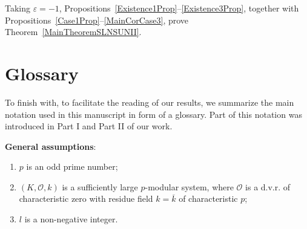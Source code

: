 \documentclass[12pt]{amsart}
\newcommand{\cO}{{\mathcal{O}}}
\theoremstyle{theorem}
\theoremstyle{definition}
\theoremstyle{remark}
\begin{document}
Taking 
$\varepsilon = -1$, Propositions~\ref{Existence1Prop}--\ref{Existence3Prop},
together with Propositions~\ref{Case1Prop}--\ref{MainCorCase3}, prove 
Theorem~\ref{MainTheoremSLNSUNII}.

\section{Glossary}\label{sec:Glossary}%
To finish with, to facilitate the reading of our results, we summarize the main 
notation used in this manuscript in form of a glossary. Part of this notation 
was introduced in Part I and Part II %
of our work. 

\medskip

\noindent\textbf{General assumptions}:
\begin{enumerate}[label=$\bullet$, leftmargin=5mm]
	\item  $p$ is an odd prime number;
	\item  $(K,\mathcal{O},k)$ is a sufficiently large $p$-modular system, 
               where $\cO$ is a d.v.r. of characteristic zero with residue 
               field $k=\overline{k}$ of characteristic $p$;
	\item  $l$ is a non-negative integer.
\end{enumerate}
\smallskip
\end{document}
